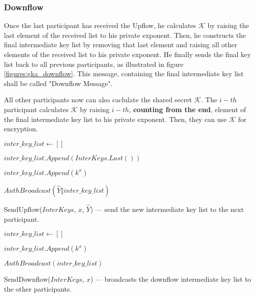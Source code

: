 \subsubsection{Downflow}
Once the last participant has received the Upflow, he calculates $\mathcal{K}$ by raising the last element of the received list to his private exponent. Then, he constructs the final intermediate key list by removing that last element and raising all other elements of the received list to his private exponent. He finally sends the final key list back to all previous participants, as illustrated in figure \ref{figures:gka_downflow}. This message, containing the final intermediate key list shall be called "Downflow Message".

All other participants now can also caclulate the shared secret $\mathcal{K}$. The $i-th$ participant calculates $\mathcal{K}$ by raising $i-th$, {\bf counting from the end}, element of the final intermediate key list to his private exponent. Then, they can use $\mathcal{K}$ for encryption.

\begin{algorithm}[t]
  \Begin
  {
    $inter\_key\_list \leftarrow []$

    $inter\_key\_list.Append(InterKeys.Last() )$

    {
      $inter\_key\_list.Append(k^x)$
    }

    $AuthBroadcast(\hat{Y} \Vert inter\_key\_list)$
  }
  \caption{SendUpflow($InterKeys$, $x$, $\hat{Y}$) --- send the new intermediate key list to the next participant.}
  \label{upflow_algo}
\end{algorithm}

\begin{algorithm}[t]
  \Begin
  {
    $inter\_key\_list \leftarrow []$

    {
      $inter\_key\_list.Append(k^x)$
	}

    $AuthBroadcast(inter\_key\_list)$
  }
  \caption{SendDownflow($InterKeys$, $x$) --- broadcasts the downflow intermediate key list to the other participants.}
  \label{downflow_algo}
\end{algorithm}

